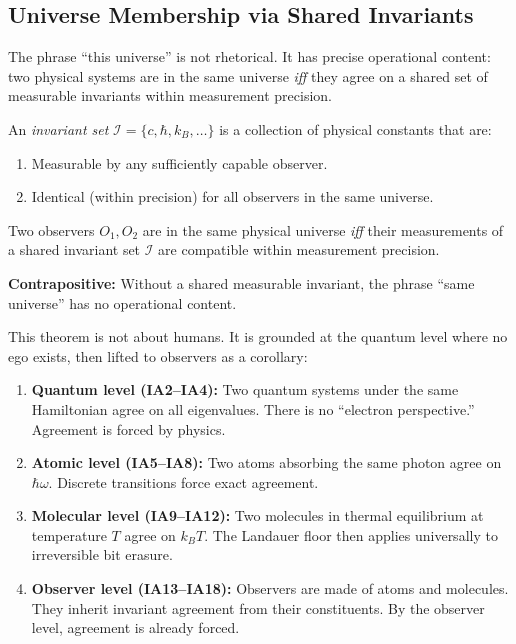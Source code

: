 \subsection{Universe Membership via Shared Invariants}\label{sec:universe-membership}

The phrase ``this universe'' is not rhetorical. It has precise operational content:
two physical systems are in the same universe \emph{iff} they agree on a shared
set of measurable invariants within measurement precision.

\begin{definition}\label{def:invariant-set}
An \emph{invariant set} $\mathcal{I} = \{c, \hbar, k_B, \ldots\}$ is a collection
of physical constants that are:
\begin{enumerate}
\item Measurable by any sufficiently capable observer.
\item Identical (within precision) for all observers in the same universe.
\end{enumerate}
\end{definition}

\begin{theorem}\label{thm:universe-membership}
Two observers $O_1, O_2$ are in the same physical universe \emph{iff} their
measurements of a shared invariant set $\mathcal{I}$ are compatible within
measurement precision.

\textbf{Contrapositive:} Without a shared measurable invariant, the phrase
``same universe'' has no operational content.
\end{theorem}

This theorem is not about humans. It is grounded at the quantum level where
no ego exists, then lifted to observers as a corollary:

\begin{enumerate}
\item \textbf{Quantum level (IA2--IA4):} Two quantum systems under the same
  Hamiltonian agree on all eigenvalues. There is no ``electron perspective.''
  Agreement is forced by physics.

\item \textbf{Atomic level (IA5--IA8):} Two atoms absorbing the same photon
  agree on $\hbar\omega$. Discrete transitions force exact agreement.

\item \textbf{Molecular level (IA9--IA12):} Two molecules in thermal equilibrium
  at temperature $T$ agree on $k_B T$. The Landauer floor then applies
  universally to irreversible bit erasure.

\item \textbf{Observer level (IA13--IA18):} Observers are made of atoms and
  molecules. They inherit invariant agreement from their constituents.
  By the observer level, agreement is already forced.
\end{enumerate}


